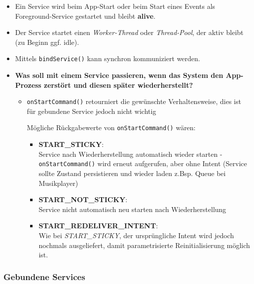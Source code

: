 \documentclass[a4paper]{article}
\begin{document}
		\begin{itemize}
			
			\item Ein Service wird beim App-Start oder beim Start eines Events als Foreground-Service gestartet und bleibt \textbf{alive}. 
			
			\item Der Service startet einen \textit{Worker-Thread} oder \textit{Thread-Pool}, der aktiv bleibt (zu Beginn ggf. idle).
			
			\item Mittels \texttt{bindService()} kann synchron kommuniziert werden.
			
			\item \textbf{Was soll mit einem Service passieren, wenn das System den App-Prozess zerstört und diesen später wiederherstellt?}
			\begin{itemize}
				
				\item \texttt{onStartCommand()} retourniert die gewünschte Verhaltensweise, dies ist für gebundene Service jedoch nicht wichtig
				
				Mögliche Rückgabewerte von \texttt{onStartCommand()} wären:
				\begin{itemize}
					
					\item \textbf{START\_STICKY}:\\
					Service nach Wiederherstellung automatisch wieder starten - \texttt{onStartCommand()} wird erneut aufgerufen, aber ohne Intent (Service sollte Zustand persistieren und wieder laden z.Bsp. Queue bei Musikplayer)
										
					\item \textbf{START\_NOT\_STICKY}:\\
					Service nicht automatisch neu starten nach Wiederherstellung
					
					\item \textbf{START\_REDELIVER\_INTENT}:\\
					Wie bei \textit{START\_STICKY}, der ursprüngliche Intent wird jedoch nochmals ausgeliefert, damit parametrisierte Reinitialisierung möglich ist.
					
				\end{itemize}
			\end{itemize}		
		\end{itemize}
	
		\subsubsection{Gebundene Services}
		
\end{document}

